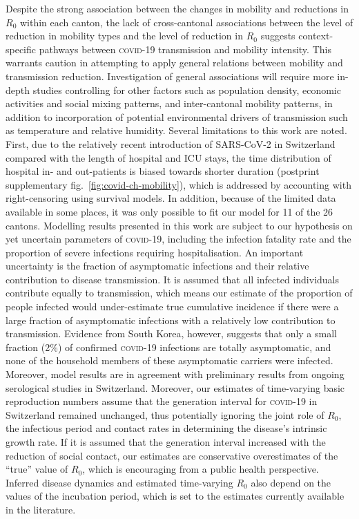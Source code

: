   Despite the strong association between the changes in mobility and reductions in $R_0$ within each canton, the lack of cross-cantonal associations between the level of reduction in mobility types and the level of reduction in $R_0$ suggests context-specific pathways between \textsc{covid}-19 transmission and mobility intensity. This warrants caution in attempting to apply general relations between mobility and transmission reduction. Investigation of general associations will require more in-depth studies controlling for other factors such as population density, economic activities and social mixing patterns, and inter-cantonal mobility patterns, in addition to incorporation of potential environmental drivers of transmission such as temperature and relative humidity\cite{Neher:PotentialImpactSeasonal:2020, Kissler:ProjectingTransmissionDynamics:2020}. Several limitations to this work are noted. First, due to the relatively recent introduction of SARS-CoV-2 in Switzerland compared with the length of hospital and ICU stays, the time distribution of hospital in- and out-patients is biased towards shorter duration (postprint supplementary fig.~\ref{fig:covid-ch-mobility}), which is addressed by accounting with right-censoring using survival models. In addition, because of the limited data available in some places, it was only possible to fit our model for 11 of the 26 cantons. Modelling results presented in this work are subject to our hypothesis on yet uncertain parameters of \textsc{covid}-19, including the infection fatality rate and the proportion of severe infections requiring hospitalisation. An important uncertainty is the fraction of asymptomatic infections and their relative contribution to disease transmission. It is assumed that all infected individuals contribute equally to transmission, which means our estimate of the proportion of people infected would under-estimate true cumulative incidence if there were a large fraction of asymptomatic infections with a relatively low contribution to transmission. Evidence from South Korea, however, suggests that only a small fraction (2\%) of confirmed \textsc{covid}-19 infections are totally asymptomatic, and none of the household members of these asymptomatic carriers were infected\cite{Park:EarlyReleaseCoronavirus:2020}. Moreover, model results are in agreement with preliminary results from ongoing serological studies in Switzerland\cite{Stringhini:RepeatedSeroprevalenceAntiSARSCoV2:2020}. Moreover, our estimates of time-varying basic reproduction numbers assume that the generation interval for \textsc{covid}-19 in Switzerland remained unchanged, thus potentially ignoring the joint role of $R_0$, the infectious period and contact rates in determining the disease’s intrinsic growth rate\cite{Yan:SeparateRolesLatent:2008}. If it is assumed that the generation interval increased with the reduction of social contact, our estimates are conservative overestimates of the “true” value of $R_0$, which is encouraging from a public health perspective. Inferred disease dynamics and estimated time-varying $R_0$ also depend on the values of the incubation period, which is set to the estimates currently available in the literature. 
